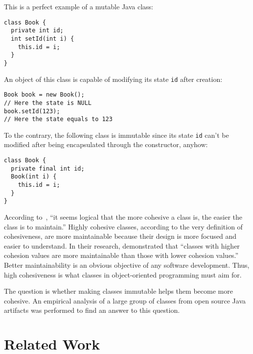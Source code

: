 \documentclass[sigconf,10pt,nonacm=true]{acmart}
\newcommand{\code}[1]{\texttt{#1}}
\begin{document}
This is a perfect example of a mutable Java class:

\begin{verbatim}
class Book {
  private int id;
  int setId(int i) {
    this.id = i;
  }
}
\end{verbatim}

An object of this class is capable of modifying its state \code{id} after creation:

\begin{verbatim}
Book book = new Book();
// Here the state is NULL
book.setId(123);
// Here the state equals to 123
\end{verbatim}

To the contrary, the following class is immutable since
its state \code{id} can't be modified
after being encapsulated through the constructor, anyhow:

\begin{verbatim}
class Book {
  private final int id;
  Book(int i) {
    this.id = i;
  }
}
\end{verbatim}

According to~\citet{li93}, ``it seems logical that the more cohesive a class is,
the easier the class is to maintain.''
Highly cohesive classes, according to the very definition of cohesiveness,
are more maintainable because their design is more focused and easier to understand.
In their research, \citet{dallal13} demonstrated that
``classes with higher cohesion values are more maintainable
than those with lower cohesion values.''
Better maintainability is an obvious objective of any software development.
Thus, high cohesiveness is what classes in object-oriented programming must aim for.

The question is whether making classes immutable helps them become more
cohesive. An empirical analysis of a large group of classes from open
source Java artifacts was performed to find an answer to this question.

\section{Related Work}
\end{document}
